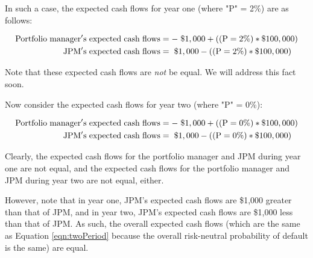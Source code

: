 \documentclass[article]{jss}
\begin{document}
In such a case, the expected cash flows for year one (where "P" = 2\%) are as follows:

\begin{align}
   \rm Portfolio\hspace{3pt}manager's\hspace{3pt}expected\hspace{3pt}cash\hspace{3pt}flows &= \rm -\hspace{3pt}\$1,000 + ((P = 2\%) * {\$100,000}) \\
    \rm JPM's\hspace{3pt}expected\hspace{3pt}cash\hspace{3pt}flows &= \rm \hspace{3pt}\$1,000 - ((P = 2\%) * {\$100,000})
\end{align}

Note that these expected cash flows are \emph{not} be equal. We will address this fact soon.

Now consider the expected cash flows for year two (where "P" = 0\%):

\begin{align}
   \rm Portfolio\hspace{3pt}manager's\hspace{3pt}expected\hspace{3pt}cash\hspace{3pt}flows &= \rm -\hspace{3pt}\$1,000 + ((P = 0\%) * {\$100,000}) \\
    \rm JPM's\hspace{3pt}expected\hspace{3pt}cash\hspace{3pt}flows &= \rm \hspace{3pt}\$1,000 - ((P = 0\%) * {\$100,000}) 
\end{align}

Clearly, the expected cash flows for the portfolio manager and JPM during year one are not equal, and the expected cash flows for the portfolio manager and JPM during year two are not equal, either.

However, note that in year one, JPM's expected cash flows are \$1,000 greater than that of JPM, and in year two, JPM's expected cash flows are \$1,000 less than that of JPM. As such, the overall expected cash flows (which are the same as Equation \ref{eqn:twoPeriod} because the overall risk-neutral probability of default is the same) are equal.
\end{document}
